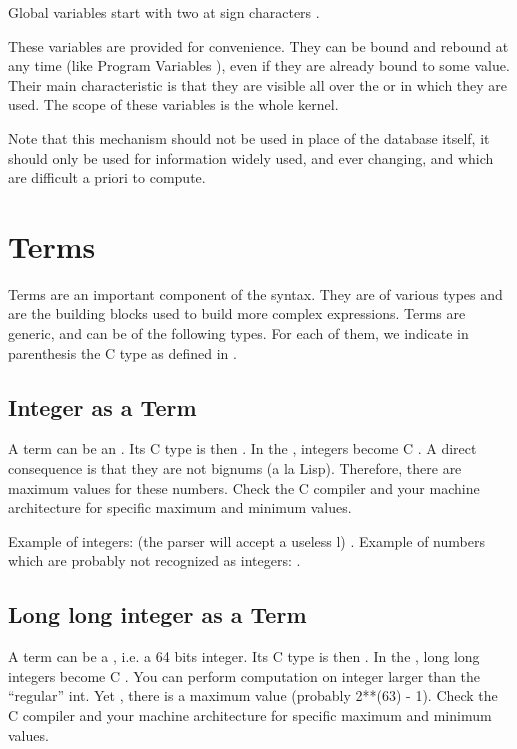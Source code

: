 Global variables start with two at sign characters .

These variables are provided for convenience. They can be bound and rebound
at any time (like Program Variables ), even if
they are already bound to some value. Their main characteristic is that
they are visible all over the \CPK{} or \XPK{} in which they are used.
The scope of these variables is the whole kernel.

Note that this mechanism should not be used in place of the database itself, it
should only be used for information widely used, and ever changing, and which
are difficult a priori to compute.

\section{Terms}

Terms are an important component of the \COPRS{} syntax. They  are of various
types and are the building blocks used to build more complex
expressions.  Terms are generic, and can be of the following types. For each of
them, we indicate in parenthesis the C type as defined in
.



\subsection{Integer as a Term}

A term can be an .  Its C type is then . In the \CPK{},
integers become C . A direct consequence is that they are not
bignums (a la Lisp). Therefore, there are maximum values for these numbers. Check the C
compiler and your machine architecture for specific maximum and minimum
values.

Example of integers: (the parser will accept a useless l) . \*
Example of numbers which are probably not recognized as integers:
.

\subsection{Long long integer as a Term}

A term can be a , i.e. a 64 bits integer.  Its C type
is then . In the \CPK{}, long long integers become C
. You can perform computation on integer larger than the
``regular'' int. Yet , there is a maximum value (probably 2**(63) - 1). Check the C compiler
and your machine architecture for specific maximum and minimum values.

